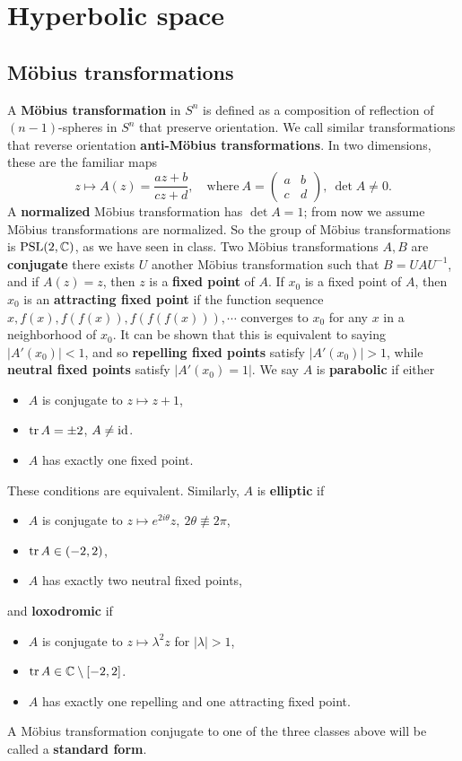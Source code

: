 \section{Hyperbolic space} 
\subsection{M\"obius transformations}
A \textbf{M\"obius transformation} in $S^n $ is defined as a composition of reflection of $(n-1)$-spheres in $S^n $ that preserve orientation. We call similar transformations that reverse orientation \textbf{anti-M\"obius transformations}. In two dimensions, these are the familiar maps \[
    z \mapsto A(z)= \frac{az+b}{cz+d}, \quad \text{where} \ A=
    \begin{pmatrix}
        a & b \\ c & d
    \end{pmatrix},\ \det A\neq 0.
\] A \textbf{normalized} M\"obius transformation has $\det A=1$; from now we assume M\"obius transformations are normalized. So the group of M\"obius transformations is $\mathrm{PSL}(2,\mathbb{C})$, as we have seen in class. Two M\"obius transformations $A,B$ are \textbf{conjugate} there exists $U$ another M\"obius transformation such that $B=UAU^{-1}$, and if $A(z)=z$, then $z$ is a \textbf{fixed point} of $A$. If $x_0$ is a fixed point of $A$, then $x_0$ is an \textbf{attracting fixed point} if the function sequence $x, f(x),f(f(x)),f(f(f(x))),\cdots $ converges to $x_0$ for any $x$ in a neighborhood of $x_0$. It can be shown that this is equivalent to saying $|A'(x_0)|<1$, and so \textbf{repelling fixed points} satisfy $|A'(x_0)|>1$, while \textbf{neutral fixed points} satisfy $|A'(x_0)=1|$. We say $A$ is \textbf{parabolic} if either
\begin{itemize}
\setlength\itemsep{-.2em}
    \item $A$ is conjugate to $z \mapsto z+1$,
    \item $\operatorname{tr} A=\pm 2$, $A\neq \operatorname{id}$.
    \item $A$ has exactly one fixed point.
\end{itemize}These conditions are equivalent. Similarly, $A$ is \textbf{elliptic} if 
\begin{itemize}
\setlength\itemsep{-.2em}
    \item $A$ is conjugate to $z \mapsto e^{2i \theta}z,\ 2\theta\not\equiv 2\pi$,
    \item $\operatorname{tr} A \in (-2,2)$,
    \item $A$ has exactly two neutral fixed points,
\end{itemize} and \textbf{loxodromic} if
\begin{itemize}
\setlength\itemsep{-.2em}
    \item $A$ is conjugate to $z \mapsto \lambda^2 z$ for $|\lambda|>1$,
    \item $\operatorname{tr} A \in \mathbb{C} \setminus [-2,2]$.
    \item $A$ has exactly one repelling and one attracting fixed point.
\end{itemize}A M\"obius transformation conjugate to one of the three classes above will be called a  \textbf{standard form}.

